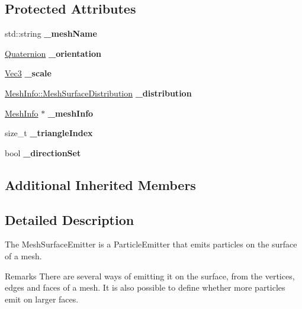 \subsection*{Protected Attributes}
\begin{DoxyCompactItemize}
\item 
\mbox{\label{classPUMeshSurfaceEmitter_a89b2dcb6cb20f1ae373daae8fca494f2}} 
std\+::string {\bfseries \+\_\+mesh\+Name}
\item 
\mbox{\label{classPUMeshSurfaceEmitter_ad3c8f22d0ca352a592b59c429cf5908d}} 
\hyperlink{classQuaternion}{Quaternion} {\bfseries \+\_\+orientation}
\item 
\mbox{\label{classPUMeshSurfaceEmitter_ab9341cd0a51e381c17d4c7faf8f0b57d}} 
\hyperlink{classVec3}{Vec3} {\bfseries \+\_\+scale}
\item 
\mbox{\label{classPUMeshSurfaceEmitter_ac1858c1b21bc8c6a330e151320e73db3}} 
\hyperlink{classMeshInfo_aadc99105abbc3bd033e33c6ba512a13b}{Mesh\+Info\+::\+Mesh\+Surface\+Distribution} {\bfseries \+\_\+distribution}
\item 
\mbox{\label{classPUMeshSurfaceEmitter_a5a1e6d75beb1cce0a8d6898ebd2fd5af}} 
\hyperlink{classMeshInfo}{Mesh\+Info} $\ast$ {\bfseries \+\_\+mesh\+Info}
\item 
\mbox{\label{classPUMeshSurfaceEmitter_a1e09eec717553b1239bc8021a5a48ab7}} 
size\+\_\+t {\bfseries \+\_\+triangle\+Index}
\item 
\mbox{\label{classPUMeshSurfaceEmitter_a8a3c74cfea74d7b418ef856e93275ed2}} 
bool {\bfseries \+\_\+direction\+Set}
\end{DoxyCompactItemize}
\subsection*{Additional Inherited Members}


\subsection{Detailed Description}
The Mesh\+Surface\+Emitter is a Particle\+Emitter that emits particles on the surface of a mesh. \begin{DoxyRemark}{Remarks}
There are several ways of emitting it on the surface, from the vertices, edges and faces of a mesh. It is also possible to define whether more particles emit on larger faces. 
\end{DoxyRemark}


